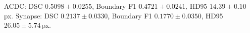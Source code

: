 ACDC: DSC $0.5098 \pm 0.0255$, Boundary F1 $0.4721 \pm 0.0241$, HD95 $14.39 \pm 0.10$\,px.
Synapse: DSC $0.2137 \pm 0.0330$, Boundary F1 $0.1770 \pm 0.0350$, HD95 $26.05 \pm 5.74$\,px.
